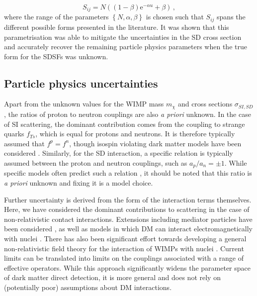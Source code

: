 \begin{equation}
\label{eq:SDparametrisation}
S_{ij} = N ((1-\beta)\mathrm{e}^{-\alpha u} + \beta)\,,
\end{equation}
where the range of the parameters $\left\{N, \alpha, \beta\right\}$ is chosen such that $S_{ij}$ spans the different possible forms presented in the literature. It was shown that this parametrisation was able to mitigate the uncertainties in the SD cross section and accurately recover the remaining particle physics parameters when the true form for the SDSFs was unknown.

\subsection{Particle physics uncertainties}
\label{sec:DD:particleunc}
Apart from the unknown values for the WIMP mass $m_\chi$ and cross sections $\sigma_{SI,SD}$, the ratios of proton to neutron couplings are also \textit{a priori} unknown. In the case of SI scattering, the dominant contribution comes from the coupling to strange quarks $f_{Ts}$, which is equal for protons and neutrons. It is therefore typically assumed that $f^p = f^n$, though isospin violating dark matter models have been considered \cite{Feng:2011, Kumar:2012,Hamaguchi:2014}. Similarly, for the SD interaction, a specific relation is typically assumed between the proton and neutron couplings, such as $a_p/a_n = \pm1$. While specific models often predict such a relation \cite{Jungman:1995}, it should be noted that this ratio is \textit{a priori} unknown and fixing it is a model choice.

Further uncertainty is derived from the form of the interaction terms themselves. Here, we have considered the dominant contributions to scattering in the case of non-relativistic contact interactions. Extensions including mediator particles have been considered \cite{Schmidt-Hoberg:2013, An:2014}, as well as models in which DM can interact electromagnetically with nuclei \cite{Pospelov:2000, Ho:2013}. There has also been significant effort towards developing a general non-relativistic field theory for the interaction of WIMPs with nuclei \cite{Kurylov:2003,Fan:2010,Cirelli:2013,Fitzpatrick:2013}. Current limits can be translated into limits on the couplings associated with a range of effective operators. While this approach significantly widens the parameter space of dark matter direct detection, it is more general and does not rely on (potentially poor) assumptions about DM interactions.

